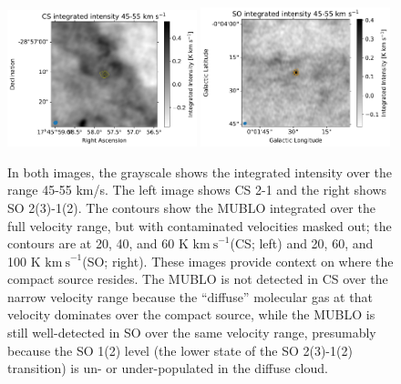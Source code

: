 \documentclass[]{aastex631}
\newcommand{\kms}{\ensuremath{\mathrm{km~s}^{-1}}\xspace}
\begin{document}
\begin{figure}
    \centering
    \includegraphics[width=0.49\textwidth]{figures/CS21_big_m0_45to55kms_with_comsrc.pdf}
    \includegraphics[width=0.49\textwidth]{figures/SO32_big_m0_45to55kms_with_comsrc.pdf}
    \caption{ In both images, the grayscale shows the integrated intensity over the range 45-55 km/s.
    The left image shows CS 2-1 and the right shows SO 2(3)-1(2).
    The contours show the MUBLO integrated over the full velocity range, but with contaminated velocities masked out; the contours are at 20, 40, and 60 K \kms (CS; left) and  20, 60, and 100 K \kms (SO; right).  
    These images provide context on where the compact source resides.
    The MUBLO is not detected in CS over the narrow velocity range because the ``diffuse'' molecular gas at that velocity dominates over the compact source, while the MUBLO is still well-detected in SO over the same velocity range, presumably because the SO 1(2) level (the lower state of the SO 2(3)-1(2) transition) is un- or under-populated in the diffuse cloud.
    }
    \label{fig:sourceoncloud}
\end{figure}
\end{document}
